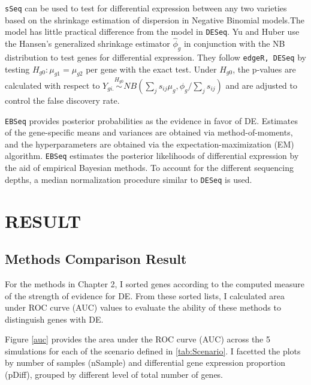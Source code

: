 \documentclass[11pt]{isuthesis}
\begin{document}
{\tt sSeq} can be used to test for differential expression between any two varieties based on the shrinkage estimation of dispersion in Negative Binomial models\citep{yu2013sseq}.The model has little practical difference from the model in {\tt DESeq}. Yu and Huber use the Hansen's generalized shrinkage estimator $\hat{\phi}_g$ in conjunction with the NB distribution to test genes for differential expression. They follow {\tt edgeR, DESeq} by testing $H_{g0}: \mu_{g1} = \mu_{g2}$ per gene with the exact test. Under $H_{g0}$, the p-values are calculated with respect to $Y_{gi.} \stackrel{H_{g0}}{\sim} NB(\sum_{j} s_{ij}\mu_{g}, \phi_{g}/\sum_{j} s_{ij})$ and are adjusted to control the false discovery rate\citep{yu2013sseq}. 

{\tt EBSeq} provides posterior probabilities as the evidence in favor of DE. Estimates of the gene-specific means and variances are obtained via method-of-moments, and the hyperparameters are obtained via the expectation-maximization (EM) algorithm\citep{leng2013ebseq}. {\tt EBSeq} estimates the posterior likelihoods of differential expression by the aid of empirical Bayesian methods. To account for the different sequencing depths, a median normalization procedure similar to {\tt DESeq} is used. 


\chapter{RESULT}

\section{Methods Comparison Result}

For the methods in Chapter 2, I sorted genes according to the computed measure of the strength of evidence for DE. From these sorted lists, I calculated area under ROC curve (AUC) values to evaluate the ability of these methods to distinguish genes with DE. 

Figure \ref{auc} provides the area under the ROC curve (AUC) across the 5 simulations for each of the scenario defined in \ref{tab:Scenario}. I facetted the plots by number of samples (nSample) and differential gene expression proportion (pDiff), grouped by different level of total number of genes. 
\end{document}

